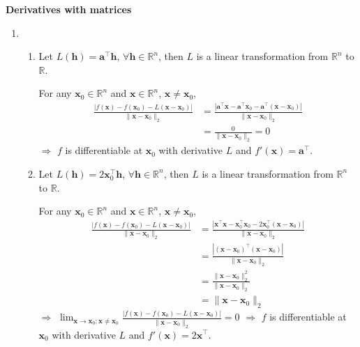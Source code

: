\documentclass[11pt,letter,notitlepage]{article}
\theoremstyle{definition}
\begin{document}
\newpage

\begin{solution}\textbf{Derivatives with matrices}
\begin{enumerate}
	\item
	\begin{enumerate}
		\item 
		Let $L(\mathbf{h}) = \mathbf{a}^{\top}\mathbf{h}$, $\forall \mathbf{h} \in \mathbb{R}^n$, then $L$ is a linear transformation from $\mathbb{R}^n$ to $\mathbb{R}$.

		For any $\mathbf{x}_0 \in \mathbb{R}^n$ and $\mathbf{x} \in \mathbb{R}^n$, $\mathbf{x} \neq \mathbf{x}_0$,
		\begin{align*}
		\frac{|f(\mathbf{x}) - f(\mathbf{x}_0) - L(\mathbf{x} - \mathbf{x}_0)|}{\|\mathbf{x} - \mathbf{x}_0\|_2}
		&=
		\frac{|\mathbf{a}^{\top}\mathbf{x} - \mathbf{a}^{\top}\mathbf{x}_0 - \mathbf{a}^{\top}(\mathbf{x} - \mathbf{x}_0)|}{\|\mathbf{x} - \mathbf{x}_0\|_2}\\
		&=
		\frac{0}{\|\mathbf{x} - \mathbf{x}_0\|_2}
		=
		0
		\end{align*}
		$\Longrightarrow$ $f$ is differentiable at $\mathbf{x}_0$ with derivative $L$ and $f'(\mathbf{x}) = \mathbf{a}^{\top}$.
		\item 
		Let $L(\mathbf{h}) = 2\mathbf{x}_0^{\top}\mathbf{h}$, $\forall \mathbf{h} \in \mathbb{R}^n$, then $L$ is a linear transformation from $\mathbb{R}^n$ to $\mathbb{R}$.

		For any $\mathbf{x}_0 \in \mathbb{R}^n$ and $\mathbf{x} \in \mathbb{R}^n$, $\mathbf{x} \neq \mathbf{x}_0$,
		\begin{align*}
		\frac{|f(\mathbf{x}) - f(\mathbf{x}_0) - L(\mathbf{x} - \mathbf{x}_0)|}{\|\mathbf{x} - \mathbf{x}_0\|_2}
		&=
		\frac{|\mathbf{x}^{\top}\mathbf{x} - \mathbf{x}_0^{\top}\mathbf{x}_0 - 2\mathbf{x}_0^{\top}(\mathbf{x} - \mathbf{x}_0)|}{\|\mathbf{x} - \mathbf{x}_0\|_2}\\
		&=
		\frac{|(\mathbf{x} - \mathbf{x}_0)^{\top}(\mathbf{x} - \mathbf{x}_0)|}{\|\mathbf{x} - \mathbf{x}_0\|_2}\\
		&=
		\frac{\|\mathbf{x} - \mathbf{x}_0\|_2^2}{\|\mathbf{x} - \mathbf{x}_0\|_2}\\
		&=
		\|\mathbf{x} - \mathbf{x}_0\|_2
		\end{align*}
		$\Longrightarrow$ $\lim_{\mathbf{x}\rightarrow\mathbf{x}_0;\mathbf{x}\neq\mathbf{x}_0}\frac{|f(\mathbf{x}) - f(\mathbf{x}_0) - L(\mathbf{x} - \mathbf{x}_0)|}{\|\mathbf{x} - \mathbf{x}_0\|_2} = 0$ $\Longrightarrow$ $f$ is differentiable at $\mathbf{x}_0$ with derivative $L$ and $f'(\mathbf{x}) = 2\mathbf{x}^{\top}$.


\end{enumerate}
\end{enumerate}
\end{solution}
\end{document}
